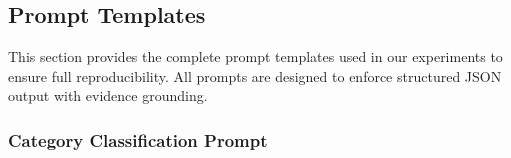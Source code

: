 \subsection{Prompt Templates}
\label{appendix:prompts}

This section provides the complete prompt templates used in our experiments to ensure full reproducibility. All prompts are designed to enforce structured JSON output with evidence grounding.

\subsubsection{Category Classification Prompt}

